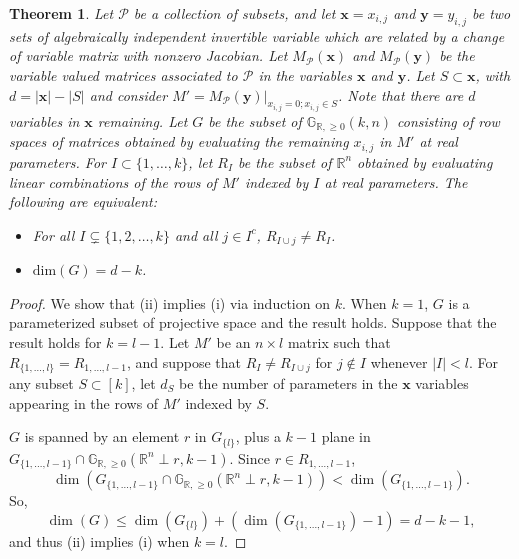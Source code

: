 \documentclass[11pt]{article}
\newcommand{\R}{\mathbb{R}}
\newcommand{\Gr}{\mathbb{G}_{\R, \geq 0}}
\newtheorem{thm}{Theorem}[section]
\theoremstyle{remark}
\theoremstyle{definition}
\begin{document}
\begin{appendices}
\begin{thm}\label{res:Rado}
Let $\mathcal{P}$ be a collection of subsets, and let $\mathbf{x} = x_{i,j}$ and $\mathbf{y} = y_{i,j}$ be two sets of algebraically independent invertible variable which are related by a change of variable matrix with nonzero Jacobian. Let $M_{\mathcal{P}}(\mathbf{x})$ and $M_{\mathcal{P}}(\mathbf{y})$ be the variable valued matrices associated to $\mathcal{P}$ in the variables $\mathbf{x}$ and $\mathbf{y}$. Let $S \subset \mathbf{x}$, with $d = |\mathbf{x}| - |S|$ and consider $M' = M_{\mathcal{P}}(\mathbf{y})|_{x_{i,j} = 0; x_{i,j} \in S}$. Note that there are $d$ variables in $\mathbf{x}$ remaining. Let $G$ be the subset of $\Gr(k,n)$ consisting of row spaces of matrices obtained by evaluating the remaining $x_{i,j}$ in $M'$ at real parameters. For $I \subset \{1, \dots, k\}$, let $R_I$ be the subset of $\mathbb{R}^n$ obtained by evaluating linear combinations of the rows of $M'$ indexed by $I$ at real parameters. The following are equivalent:
\begin{itemize}
\item[(i)] For all $I \subsetneq \{1,2, \dots, k\}$ and all $j \in I^c$, $R_{I \cup j} \neq R_I$.
\item[(ii)] $\mathrm{dim}(G) = d-k$.
\end{itemize}
\end{thm}

\begin{proof}
We show that (ii) implies (i) via induction on $k$. When $k = 1$, $G$ is a parameterized subset of projective space and the result holds. Suppose that the result holds for $k = l-1$. Let $M'$ be an $n \times l$ matrix such that $R_{\{1,\dots,l\}} = R_{1,\dots,l-1}$, and suppose that $R_I \neq R_{I \cup j}$ for $j \notin I$ whenever $|I| < l$. For any subset $S \subset [k]$, let $d_S$ be the number of parameters in the $\mathbf{x}$ variables appearing in the rows of $M'$ indexed by $S$.

$G$ is spanned by an element $r$ in $G_{\{l\}}$, plus a $k-1$ plane in $G_{\{1,\dots,l-1\}} \cap \Gr(\mathbb{R}^n \perp r, k-1)$. Since $r \in R_{1, \dots, l-1}$,
%
\begin{displaymath}
\dim(G_{\{1,\dots,l-1\}} \cap \Gr(\mathbb{R}^n \perp r, k-1)) < \dim(G_{\{1,\dots,l-1\}}).
\end{displaymath}
%
\noindent
So,
%
\begin{displaymath}
\dim(G) \leq \dim(G_{\{l\}}) + (\dim(G_{\{1,\dots,l-1\}}) - 1) = d -k - 1,
\end{displaymath}
%
\noindent
and thus (ii) implies (i) when $k = l$.


\end{proof}
\end{appendices}
\end{document}
